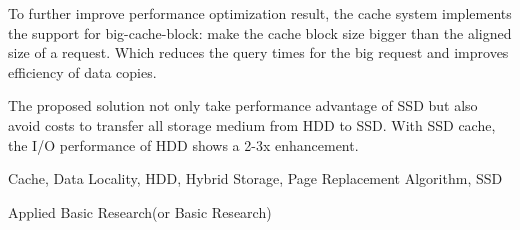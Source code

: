 \begin{eabstract}
\noindent To further improve performance optimization result, the cache system implements the support for big-cache-block: make the cache block size bigger than the aligned size of a request. Which reduces the query times for the big request and improves efficiency of data copies.
\vspace{1em}

\noindent The proposed solution not only take performance advantage of SSD but also avoid costs to transfer all storage medium from HDD to SSD. With SSD cache, the I/O performance of HDD shows a 2-3x enhancement.

\end{eabstract}

\begin{ekeywords}
Cache, Data Locality, HDD, Hybrid Storage, Page Replacement Algorithm, SSD
\end{ekeywords}

\begin{ethesistype}
Applied Basic Research(or Basic Research)
\end{ethesistype}

